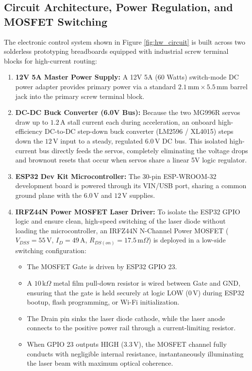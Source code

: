 \subsection{Circuit Architecture, Power Regulation, and MOSFET Switching}
The electronic control system shown in Figure \ref{fig:hw_circuit} is built across two solderless prototyping breadboards equipped with industrial screw terminal blocks for high-current routing:
\begin{enumerate}
    \item \textbf{12V 5A Master Power Supply:} A 12V 5A (60 Watts) switch-mode DC power adapter provides primary power via a standard $2.1\,\text{mm} \times 5.5\,\text{mm}$ barrel jack into the primary screw terminal block.
    \item \textbf{DC-DC Buck Converter (6.0V Bus):} Because the two MG996R servos draw up to $1.2\,\text{A}$ stall current each during acceleration, an onboard high-efficiency DC-to-DC step-down buck converter (LM2596 / XL4015) steps down the $12\,\text{V}$ input to a steady, regulated $6.0\,\text{V}$ DC bus. This isolated high-current bus directly feeds the servos, completely eliminating the voltage drops and brownout resets that occur when servos share a linear 5V logic regulator.
    \item \textbf{ESP32 Dev Kit Microcontroller:} The 30-pin ESP-WROOM-32 development board is powered through its VIN/USB port, sharing a common ground plane with the $6.0\,\text{V}$ and $12\,\text{V}$ supplies.
    \item \textbf{IRFZ44N Power MOSFET Laser Driver:} To isolate the ESP32 GPIO logic and ensure clean, high-speed switching of the laser diode without loading the microcontroller, an IRFZ44N N-Channel Power MOSFET ($V_{DSS} = 55\,\text{V}$, $I_D = 49\,\text{A}$, $R_{DS(on)} = 17.5\,\text{m}\Omega$) is deployed in a low-side switching configuration:
    \begin{itemize}
        \item The MOSFET Gate is driven by ESP32 GPIO 23.
        \item A $10\,\text{k}\Omega$ metal film pull-down resistor is wired between Gate and GND, ensuring that the gate is held securely at logic LOW ($0\,\text{V}$) during ESP32 bootup, flash programming, or Wi-Fi initialization.
        \item The Drain pin sinks the laser diode cathode, while the laser anode connects to the positive power rail through a current-limiting resistor.
        \item When GPIO 23 outputs HIGH ($3.3\,\text{V}$), the MOSFET channel fully conducts with negligible internal resistance, instantaneously illuminating the laser beam with maximum optical coherence.
    \end{itemize}
\end{enumerate}

